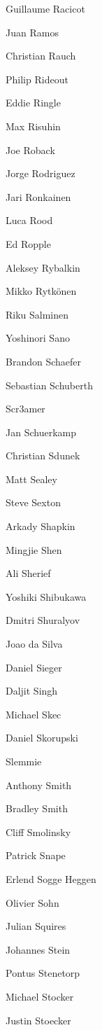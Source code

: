 \begin{DoxyItemize}
\item Guillaume Racicot
\item Juan Ramos
\item Christian Rauch
\item Philip Rideout
\item Eddie Ringle
\item Max Risuhin
\item Joe Roback
\item Jorge Rodriguez
\item Jari Ronkainen
\item Luca Rood
\item Ed Ropple
\item Aleksey Rybalkin
\item Mikko Rytkönen
\item Riku Salminen
\item Yoshinori Sano
\item Brandon Schaefer
\item Sebastian Schuberth
\item Scr3amer
\item Jan Schuerkamp
\item Christian Sdunek
\item Matt Sealey
\item Steve Sexton
\item Arkady Shapkin
\item Mingjie Shen
\item Ali Sherief
\item Yoshiki Shibukawa
\item Dmitri Shuralyov
\item Joao da Silva
\item Daniel Sieger
\item Daljit Singh
\item Michael Skec
\item Daniel Skorupski
\item Slemmie
\item Anthony Smith
\item Bradley Smith
\item Cliff Smolinsky
\item Patrick Snape
\item Erlend Sogge Heggen
\item Olivier Sohn
\item Julian Squires
\item Johannes Stein
\item Pontus Stenetorp
\item Michael Stocker
\item Justin Stoecker

\end{DoxyItemize}
